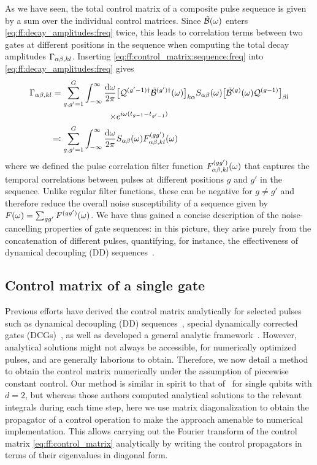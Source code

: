 As we have seen, the total control matrix of a composite pulse sequence is given by a sum over the individual control matrices.
Since $\tilde{\mathcal{B}}(\omega)$ enters \cref{eq:ff:decay_amplitudes:freq} twice, this leads to correlation terms between two gates at different positions in the sequence when computing the total decay amplitudes $\Gamma_{\alpha\beta,kl}$.
Inserting \cref{eq:ff:control_matrix:sequence:freq} into \cref{eq:ff:decay_amplitudes:freq} gives
\begin{equation}\label{eq:ff:decay_amplitudes:pulse_correlation}
\begin{split}
    \Gamma_{\alpha\beta,kl} = \sum_{g,g'=1}^{G}\int_{-\infty}^\infty\frac{\dd{\omega}}{2\pi} &
    \bigl[\mathcal{Q}^{(g'-1)\dagger}\tilde{\mathcal{B}}^{(g')\dagger}(\omega)\bigr]_{k\alpha}
    S_{\alpha\beta}(\omega)
    \bigl[\tilde{\mathcal{B}}^{(g)}(\omega)\mathcal{Q}^{(g-1)}\bigr]_{\beta l} \\
    \times &e^{i\omega(t_{g-1} - t_{g'-1})} \\
    \eqqcolon\sum_{g,g'=1}^{G}\int_{-\infty}^\infty\frac{\dd{\omega}}{2\pi} &
    S_{\alpha\beta}(\omega) F_{\alpha\beta,kl}^{(gg')}(\omega)
\end{split}
\end{equation}
where we defined the pulse correlation filter function $F_{\alpha\beta,kl}^{(gg')}(\omega)$ that captures the temporal correlations between pulses at different positions $g$ and $g'$ in the sequence.
Unlike regular filter functions, these can be negative for $g\neq g'$ and therefore reduce the overall noise susceptibility of a sequence given by $F(\omega) = \sum_{gg'}F^{(gg')}(\omega)$.
We have thus gained a concise description of the noise-cancelling properties of gate sequences: in this picture, they arise purely from the concatenation of different pulses, quantifying, for instance, the effectiveness of dynamical decoupling (DD) sequences~\cite{Cerfontaine2021}.

\subsection{Control matrix of a single gate}\label{subsec:ff:theory:control_matrix:pulse}
Previous efforts have derived the control matrix analytically for selected pulses such as dynamical decoupling (DD) sequences~\cite{Cywinski2008}, special dynamically corrected gates (DCGs)~\cite{Gungordu2018}, as well as developed a general analytic framework~\cite{Green2012,Green2013}.
However, analytical solutions might not always be accessible, \eg for numerically optimized pulses, and are generally laborious to obtain.
Therefore, we now detail a method to obtain the control matrix numerically under the assumption of piecewise constant control.
Our method is similar in spirit to that of~\citet{Green2012} for single qubits with $d=2$, but whereas those authors computed analytical solutions to the relevant integrals during each time step, here we use matrix diagonalization to obtain the propagator of a control operation to make the approach amenable to numerical implementation.
This allows carrying out the Fourier transform of the control matrix \cref{eq:ff:control_matrix} analytically by writing the control propagators in terms of their eigenvalues in diagonal form.


